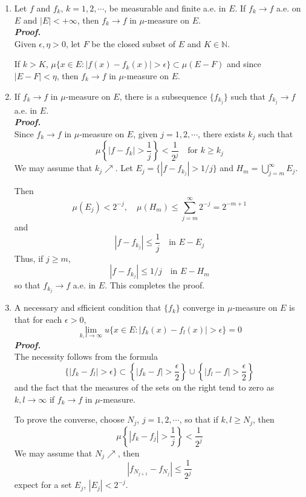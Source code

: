 \documentclass[a4paper,11pt]{article}
\begin{document}
\begin{enumerate}
	\begin{enumerate}
		\item
			Let $f$ and $f_k$, $k = 1,2,\cdots$, be measurable and finite a.e. in $E$. If $f_k \to f$ a.e. on $E$ and $|E| < +\infty$, then $f_k \to f$ in $\mu$-measure on $E$.\\
			\newline
			\textit{\textbf {Proof.}}\\
			Given $\epsilon, \eta > 0$, let $F$ be the closed subset of $E$ and $K \in \mathbb{N}$.\

			If $k > K$, $\mu\{x \in E : |f(x) - f_k(x)| > \epsilon\} \subset \mu(E-F)$ and since $|E - F| < \eta$, then $f_k \to f$ in $\mu$-measure on $E$.\\

		\item
			If $f_k \to f$ in $\mu$-measure on $E$, there is a subsequence $\{f_{k_j}\}$ such that $f_{k_j} \to f$ a.e. in $E$.\\
			\newline
			\textit{\textbf {Proof.}}\\
			Since $f_k \to f$ in $\mu$-measure on $E$, given $j = 1,2,\cdots$, there exists $k_j$ such that
				$$\mu\left\{ |f - f_k| > \frac{1}{j} \right\} < \frac{1}{2^j} \quad \text{for $k \geq k_j$}$$
			We may assume that $k_j \nearrow$. Let $E_j = \{ |f - f_{k_j}| > 1/j \}$ and $H_m = \bigcup_{j=m}^\infty E_j $.\

			Then 
				$$\mu(E_j) < 2^{-j}, \quad \mu(H_m) \leq \sum_{j=m}^\infty 2^{-j} = 2^{-m+1}$$
			and
				$$|f - f_{k_j}| \leq \frac{1}{j} \quad \text{in } E - E_j$$
			Thus, if $j \geq m$,
				$$|f - f_{k_j}| \leq 1/j \quad \text{in } E - H_m$$
			so that $f_{k_j} \to f$ a.e. in $E$. This completes the proof.\\


		\item
			A necessary and sfficient condition that $\{f_k\}$ converge in $\mu$-measure on $E$ is that for each $\epsilon > 0$,
				$$\underset{k, l \to \infty}{\lim} u\{x \in E : |f_k(x) - f_l(x)| > \epsilon\} = 0$$
			\textit{\textbf {Proof.}}\\
			The necessity follows from the formula
				$$\{|f_k - f_l| > \epsilon\}
				\subset
				\left\{ |f_k - f| > \frac{\epsilon}{2} \right\} \cup \left\{ |f_l - f| > \frac{\epsilon}{2} \right\}$$
			and the fact that the measures of the sets on the right tend to zero as $k, l \to \infty$ if $f_k \to f$ in $\mu$-measure.\

			To prove the converse, choose $N_j$, $j = 1,2,\cdots$, so that if $k, l \geq N_j$, then
				$$\mu\left\{ |f_k - f_j| > \frac{1}{j} \right\} < \frac{1}{2^j}$$
			We may assume that $N_j \nearrow$, then
				$$|f_{N_{j+1}} - f_{N_j}| \leq \frac{1}{2^j}$$
			expect for a set $E_j$, $|E_j| < 2^{-j}$.\


\end{enumerate}
\end{enumerate}
\end{document}

